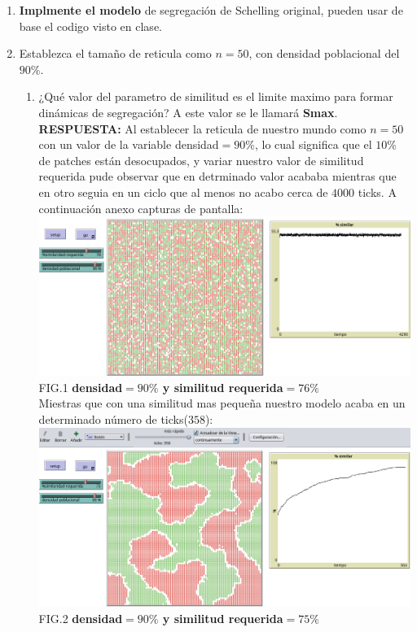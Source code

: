 \documentclass[12pt]{article}
\begin{document}
\begin{enumerate}
    \item \textbf{Implmente el modelo} de segregación de Schelling original, pueden usar de base el codigo visto en clase.
    \item Establezca el tamaño de reticula como $n=50$, con densidad poblacional del $90\%$.
    \begin{enumerate}
        \item ¿Qué valor del parametro de similitud es el limite maximo para formar dinámicas de segregación? A este valor se le llamará \textbf{Smax}.\\
        
        \textbf{\color{red} RESPUESTA:} Al establecer la reticula de nuestro mundo como $n=50$ con un valor de la variable densidad$=90\%$, lo cual significa que el $10\%$ de patches están desocupados,
        y variar nuestro valor de similitud requerida pude observar que en detrminado valor acababa mientras que en otro seguia en un ciclo que al menos no acabo cerca de $4000$ ticks. A continuación anexo capturas de pantalla:\\

        \includegraphics[scale = 0.40]{images/fig1.png} FIG.1 \textbf{densidad$=90\%$ y similitud requerida$=76\%$}\\

        Miestras que con una similitud mas pequeña nuestro modelo acaba en un determinado número de ticks($358$):\\

        \includegraphics[scale = 0.40]{images/fig2.png} FIG.2 \textbf{densidad$=90\%$ y similitud requerida$=75\%$}\\


\end{enumerate}
\end{enumerate}
\end{document}
